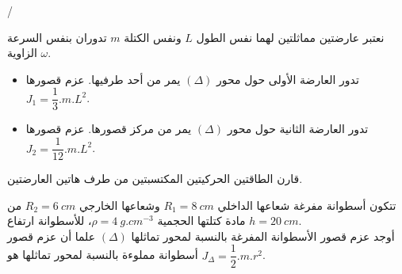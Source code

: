 \documentclass[12pt,a4paper]{article}
\begin{document}
					\begin{exercice}{}/
\begin{enumerate}
					\item 	نعتبر عارضتين مماثلتين لهما نفس الطول 
	$L$				
					ونفس الكتلة 
	$m$				
					تدوران بنفس السرعة الزاوية 
	$\omega$.				
					\begin{itemize}
					\item تدور العارضة الأولى حول محور 
					$(\Delta)$
					يمر من أحد طرفيها.
					عزم قصورها 
					$J_{1}=\dfrac{1}{3}.m.L^{2}$.
					\item تدور العارضة الثانية حول محور 
					$(\Delta)$
					يمر من مركز قصورها.
					عزم قصورها 
					$J_{2}=\dfrac{1}{12}.m.L^{2}$.
					\end{itemize}
					قارن الطاقتين الحركيتين المكتسبتين من طرف هاتين العارضتين.\\
\begin{minipage}[c]{0.73\linewidth}
\item تتكون أسطوانة مفرغة شعاعها الداخلي 
$R_1=8\ cm$
وشعاعها الخارجي 
$R_2=6\ cm$
من مادة كتلتها الحجمية
$\rho =4\ g.cm^{-3}$،
للأسطوانة ارتفاع 
$h=20\ cm$.
\\أوجد عزم قصور الأسطوانة المفرغة بالنسبة لمحور تماثلها
$(\Delta)$
علما أن عزم قصور أسطوانة مملوءة بالنسبة لمحور تماثلها هو 
$J_{\Delta}=\dfrac{1}{2}.m.r^{2}$.
\end{minipage}
					\begin{minipage}[c]{0.25\linewidth}
\begin{flushleft}
\begin{adjustbox}{width=0.7\linewidth}
\end{adjustbox}
\end{flushleft}
\end{minipage}
\end{enumerate}
\end{exercice}
\end{document}
